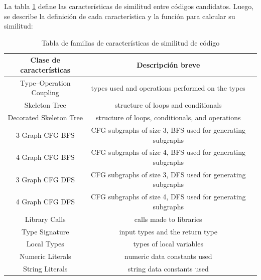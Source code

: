 La tabla \ref{table:search-similarity} define las características de similitud entre códigos candidatos. Luego, se describe la definición de cada característica y la función para calcular su similitud:

\begin{table}[h]
\centering
\begin{threeparttable}[b]
\caption{Tabla de familias de características de similitud de código}
\label{table:search-similarity}
\begin{tabular}{ccc} \toprule
    {Clase de características} & {Descripción breve} \\ \midrule
Type–Operation Coupling & types used and operations performed on the types \\
Skeleton Tree & structure of loops and conditionals \\
Decorated Skeleton Tree & structure of loops, conditionals, and operations \\
3 Graph CFG BFS & CFG subgraphs of size 3, BFS used for generating subgraphs \\
4 Graph CFG BFS & CFG subgraphs of size 4, BFS used for generating subgraphs \\
3 Graph CFG DFS & CFG subgraphs of size 3, DFS used for generating subgraphs \\
4 Graph CFG DFS & CFG subgraphs of size 4, DFS used for generating subgraphs \\
Library Calls & calls made to libraries \\
Type Signature & input types and the return type \\
Local Types & types of local variables \\
Numeric Literals & numeric data constants used \\
String Literals & string data constants used \\
\bottomrule
\end{tabular}
\end{threeparttable}
\end{table}

